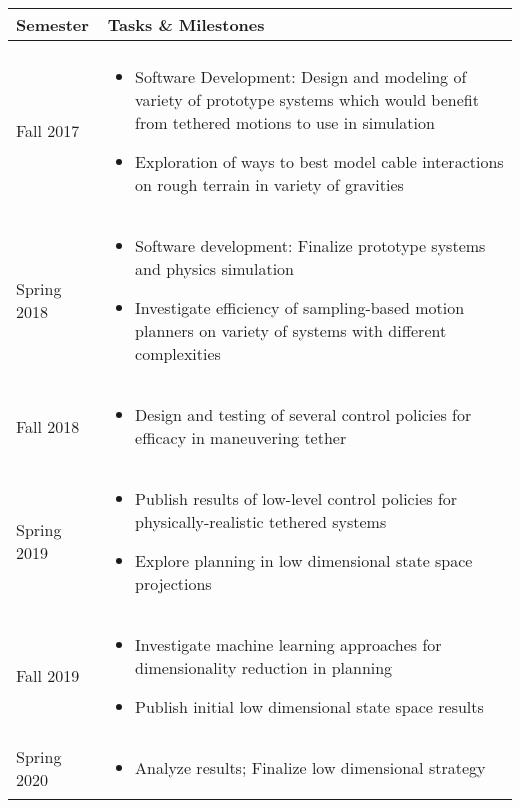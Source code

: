 \documentclass[12pt]{article}
\begin{document}
\newpage
\vspace{2cm}
\begin{center}
    \begin{tabular}{ | p{3cm} | p{11cm} |}
    \hline
    Semester & Tasks \& Milestones \\ \hline \\
    Fall 2017 & 
    \begin{itemize}
    	\item Software Development: Design and modeling of variety of prototype systems which would benefit from tethered motions to use in simulation
    	\item Exploration of ways to best model cable interactions on rough terrain in variety of gravities 
	\end{itemize}\\
	    Spring 2018 & 
    \begin{itemize}
    	\item Software development: Finalize prototype systems and physics simulation
    	\item Investigate efficiency of sampling-based motion planners on variety of systems with different complexities
	\end{itemize}\\
	    Fall 2018 & 
    \begin{itemize}
    	\item Design and testing of several control policies for efficacy in maneuvering tether
	\end{itemize}\\
	    Spring 2019 & 
    \begin{itemize}
    	\item Publish results of low-level control policies for physically-realistic tethered systems 
    	\item Explore planning in low dimensional state space projections
	\end{itemize}\\
	    Fall 2019 & 
    \begin{itemize}
    	\item Investigate machine learning approaches for dimensionality reduction in planning
    	\item Publish initial low dimensional state space results
	\end{itemize}\\
	    Spring 2020 & 
    \begin{itemize}
    	\item Analyze results; Finalize low dimensional strategy

\end{itemize}
\end{tabular}
\end{center}
\end{document}
